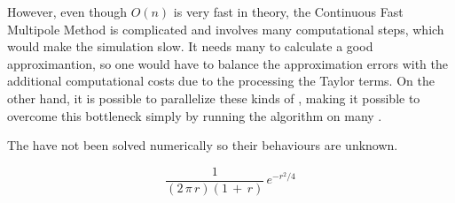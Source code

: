 However, even though $O(n)$ is very fast in theory, the Continuous Fast Multipole Method is complicated and involves many computational steps, which would make the simulation slow. It needs many  to calculate a good approximantion, so one would have to balance the approximation errors with the additional computational costs due to the processing the Taylor terms. On the other hand, it is possible to parallelize these kinds of  \citep[see e.g.][]{Board1994}, making it possible to overcome this bottleneck simply by running the algorithm on many .

The  have not been solved numerically so their behaviours are unknown.


\begin{equation}
\frac{1}{(2\,\pi\,r)(1\,+\,r)}\,e^{-r^2/4}
\end{equation}

